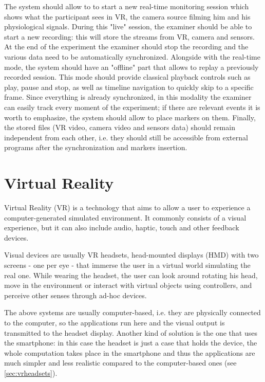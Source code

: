 \documentclass[binding=0.6cm,LaM]{sapthesis}
\begin{document}
The system should allow to to start a new real-time monitoring session which shows what the participant sees in VR, the camera source filming him and his physiological signals. During this "live" session, the examiner should be able to start a new recording: this will store the streams from VR, camera and sensors. At the end of the experiment the examiner should stop the recording and the various data need to be automatically synchronized. Alongside with the real-time mode, the system should have an "offline" part that allows to replay a previously recorded session. This mode should provide classical playback controls such as play, pause and stop, as well as timeline navigation to quickly skip to a specific frame. Since everything is already synchronized, in this modality the examiner can easily track every moment of the experiment; if there are relevant events it is worth to emphasize, the system should allow to place markers on them. 
Finally, the stored files (VR video, camera video and sensors data) should remain independent from each other, i.e. they should still be accessible from external programs after the synchronization and markers insertion.

\section{Virtual Reality}
Virtual Reality (VR) is a technology that aims to allow a user to experience a computer-generated simulated environment. It commonly consists of a visual experience, but it can also include audio, haptic, touch and other feedback devices. 

Visual devices are usually VR headsets, head-mounted displays (HMD) with two screens - one per eye - that immerse the user in a virtual world simulating the real one. While wearing the headset, the user can look around rotating his head, move in the environment or interact with virtual objects using controllers, and perceive other senses through ad-hoc devices.

The above systems are usually computer-based, i.e. they are physically connected to the computer, so the applications run here and the visual output is transmitted to the headset display.
Another kind of solution is the one that uses the smartphone: in this case the headset is just a case that holds the device, the whole computation takes place in the smartphone and thus the applications are much simpler and less realistic compared to the computer-based ones (see \ref{sec:vrheadsets}).
	
\end{document}
